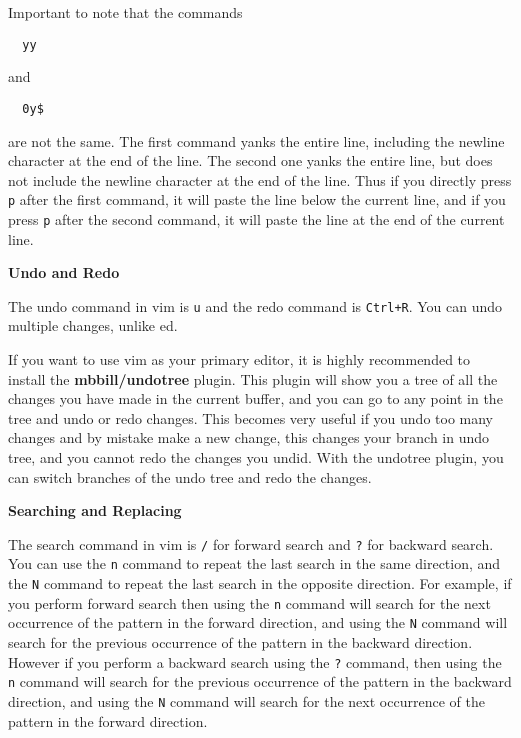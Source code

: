 \begin{remark}
  Important to note that the commands
  \begin{lstlisting}
  yy \end{lstlisting}
  and
  \begin{lstlisting}
  0y$ \end{lstlisting}
  are not the same. The first command yanks the entire line,
  including the newline character at the end of the line.
  The second one yanks the entire line, but does not include
  the newline character at the end of the line.
  Thus if you directly press \lstinline|p| after the first command,
  it will paste the line below the current line, and if you
  press \lstinline|p| after the second command, it will paste
  the line at the end of the current line.
\end{remark}

\textbf{Undo and Redo}

The undo command in vim is \lstinline|u| and the redo command
is \lstinline|Ctrl+R|. You can undo multiple changes, unlike ed.

\begin{remark}
  If you want to use vim as your primary editor,
  it is highly recommended to install the
  \textbf{mbbill/undotree} plugin. This plugin
  will show you a tree of all the changes you
  have made in the current buffer, and you can
  go to any point in the tree and undo or redo
  changes. This becomes very useful if you undo
  too many changes and by mistake make a new change,
  this changes your branch in undo tree, and you cannot redo
  the changes you undid. With the undotree plugin,
  you can switch branches of the undo tree and redo
  the changes.
\end{remark}

\textbf{Searching and Replacing}

The search command in vim is \lstinline|/| for forward search
and \lstinline|?| for backward search. You can use the \lstinline|n|
command to repeat the last search in the same direction,
and the \lstinline|N| command to repeat the last search in the
opposite direction. For example, if you perform forward search
then using the \lstinline|n| command will search for the next
occurrence of the pattern in the forward direction, and using
the \lstinline|N| command will search for the previous occurrence
of the pattern in the backward direction. However if you perform
a backward search using the \lstinline|?| command, then using the
\lstinline|n| command will search for the previous occurrence of the
pattern in the backward direction, and using the \lstinline|N| command
will search for the next occurrence of the pattern in the forward
direction.

